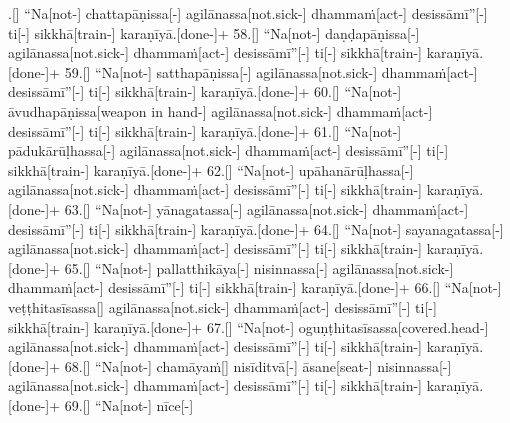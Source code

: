 \documentclass[12pt]{article}
\begin{document}
\begin{paracol}{2}
\begin{column}
\switchcolumn


\begin{flushleft}
.[] “Na[not-] chattapāṇissa[-\NUL{\GMU{}}] agilānassa[not.sick-] dhammaṁ[act-] desissāmī”[-\NUL{\GMU{}}] ti[-\NUL{\GMU{}}] sikkhā[train-] karaṇīyā.[done-]+ 58.[] “Na[not-] daṇḍapāṇissa[-\NUL{\GMU{}}] agilānassa[not.sick-] dhammaṁ[act-] desissāmī”[-\NUL{\GMU{}}] ti[-\NUL{\GMU{}}] sikkhā[train-] karaṇīyā.[done-]+ 59.[] “Na[not-] satthapāṇissa[-\NUL{\GMU{}}] agilānassa[not.sick-] dhammaṁ[act-] desissāmī”[-\NUL{\GMU{}}] ti[-\NUL{\GMU{}}] sikkhā[train-] karaṇīyā.[done-]+ 60.[] “Na[not-] āvudhapāṇissa[weapon in hand-] agilānassa[not.sick-] dhammaṁ[act-] desissāmī”[-\NUL{\GMU{}}] ti[-\NUL{\GMU{}}] sikkhā[train-] karaṇīyā.[done-]+ 61.[] “Na[not-] pādukārūḷhassa[-\NUL{\GMU{}}] agilānassa[not.sick-] dhammaṁ[act-] desissāmī”[-\NUL{\GMU{}}] ti[-\NUL{\GMU{}}] sikkhā[train-] karaṇīyā.[done-]+ 62.[] “Na[not-] upāhanārūḷhassa[-\NUL{\GMU{}}] agilānassa[not.sick-] dhammaṁ[act-] desissāmī”[-\NUL{\GMU{}}] ti[-\NUL{\GMU{}}] sikkhā[train-] karaṇīyā.[done-]+ 63.[] “Na[not-] yānagatassa[-\NUL{\GMU{}}] agilānassa[not.sick-] dhammaṁ[act-] desissāmī”[-\NUL{\GMU{}}] ti[-\NUL{\GMU{}}] sikkhā[train-] karaṇīyā.[done-]+ 64.[] “Na[not-] sayanagatassa[-\NUL{\GMU{}}] agilānassa[not.sick-] dhammaṁ[act-] desissāmī”[-\NUL{\GMU{}}] ti[-\NUL{\GMU{}}] sikkhā[train-] karaṇīyā.[done-]+ 65.[] “Na[not-] pallatthikāya[-\NUL{\GMU{}}] nisinnassa[-\NUL{\GMU{}}] agilānassa[not.sick-] dhammaṁ[act-] desissāmī”[-\NUL{\GMU{}}] ti[-\NUL{\GMU{}}] sikkhā[train-] karaṇīyā.[done-]+ 66.[] “Na[not-] veṭṭhitasīsassa[] agilānassa[not.sick-] dhammaṁ[act-] desissāmī”[-\NUL{\GMU{}}] ti[-\NUL{\GMU{}}] sikkhā[train-] karaṇīyā.[done-]+ 67.[] “Na[not-] oguṇṭhitasīsassa[covered.head-] agilānassa[not.sick-] dhammaṁ[act-] desissāmī”[-\NUL{\GMU{}}] ti[-\NUL{\GMU{}}] sikkhā[train-] karaṇīyā.[done-]+ 68.[] “Na[not-] chamāyaṁ[] nisīditvā[-\NUL{\GMU{}}] āsane[seat-] nisinnassa[-\NUL{\GMU{}}] agilānassa[not.sick-] dhammaṁ[act-] desissāmī”[-\NUL{\GMU{}}] ti[-\NUL{\GMU{}}] sikkhā[train-] karaṇīyā.[done-]+ 69.[] “Na[not-] nīce[-\NUL{\GMU{}}] 
\end{flushleft}
\end{column}
\end{paracol}
\end{document}

